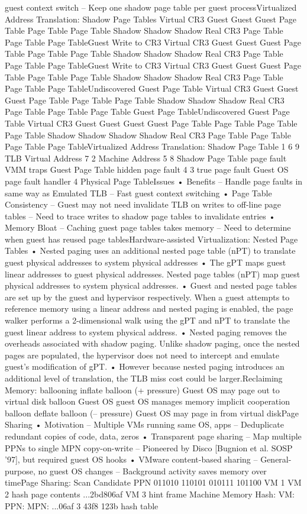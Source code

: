\documentclass[10pt]{article}
\begin{document}
guest context switch
–  Keep one shadow page table per guest processVirtualized Address Translation:
Shadow Page Tables
Virtual
CR3
Guest
Guest
Guest
Page Table Page Table Page Table
Shadow Shadow Shadow
Real CR3
Page Table
Page Table
Page TableGuest Write to CR3
Virtual
CR3
Guest
Guest
Guest
Page Table Page Table Page Table
Shadow Shadow Shadow
Real CR3
Page Table
Page Table
Page TableGuest Write to CR3
Virtual
CR3
Guest
Guest
Guest
Page Table Page Table Page Table
Shadow Shadow Shadow
Real CR3
Page Table
Page Table
Page TableUndiscovered Guest Page Table
Virtual
CR3
Guest
Guest
Guest
Page Table Page Table Page Table
Shadow Shadow Shadow
Real CR3
Page Table
Page Table
Page Table
Guest
Page TableUndiscovered Guest Page Table
Virtual
CR3
Guest
Guest
Guest
Guest
Page Table Page Table Page Table Page Table
Shadow Shadow Shadow Shadow
Real CR3
Page Table
Page Table
Page Table
Page TableVirtualized Address Translation:
Shadow Page Table
1
6
9
TLB
Virtual Address
7
2
Machine Address
5
8
Shadow
Page
Table
page
fault
VMM
traps
Guest
Page
Table
hidden
page
fault
4
3
true
page
fault
Guest OS
page fault
handler
4
Physical
Page
TableIssues
•  Benefits
–  Handle page faults in same way as Emulated TLB
–  Fast guest context switching
•  Page Table Consistency
–  Guest may not need invalidate TLB on writes to
off-line page tables
–  Need to trace writes to shadow page tables to
invalidate entries
•  Memory Bloat
–  Caching guest page tables takes memory
–  Need to determine when guest has reused page
tablesHardware-assisted Virtualization:
Nested Page Tables
•  Nested paging uses an additional nested page table (nPT) to translate guest
physical addresses to system physical addresses
•  The gPT maps guest linear addresses to guest physical addresses. Nested page
tables (nPT) map guest physical addresses to system physical addresses.
•  Guest and nested page tables are set up by the guest and hypervisor respectively.
When a guest attempts to reference memory using a linear address and nested
paging is enabled, the page walker performs a 2-dimensional walk using the gPT
and nPT to translate the guest linear address to system physical address.
•  Nested paging removes the overheads associated with shadow paging. Unlike
shadow paging, once the nested pages are populated, the hypervisor does not
need to intercept and emulate guest’s modification of gPT.
•  However because nested paging introduces an additional level of translation, the
TLB miss cost could be larger.Reclaiming Memory: ballooning
inflate balloon
(+ pressure)
Guest OS
may page out
to virtual disk
balloon
Guest OS
guest OS manages memory
implicit cooperation
balloon
deflate balloon
(– pressure)
Guest OS
may page in
from virtual diskPage Sharing
•  Motivation
–  Multiple VMs running same OS, apps
–  Deduplicate redundant copies of code, data,
zeros
•  Transparent page sharing
–  Map multiple PPNs to single MPN copy-on-write
–  Pioneered by Disco [Bugnion et al. SOSP ’97],
but required guest OS hooks
•  VMware content-based sharing
–  General-purpose, no guest OS changes
–  Background activity saves memory over timePage Sharing: Scan Candidate PPN
011010
110101
010111
101100
VM 1
VM 2
hash page contents
...2bd806af
VM 3
hint frame
Machine
Memory
Hash:
VM:
PPN:
MPN:
...06af
3
43f8
123b
hash
table
\end{document}
